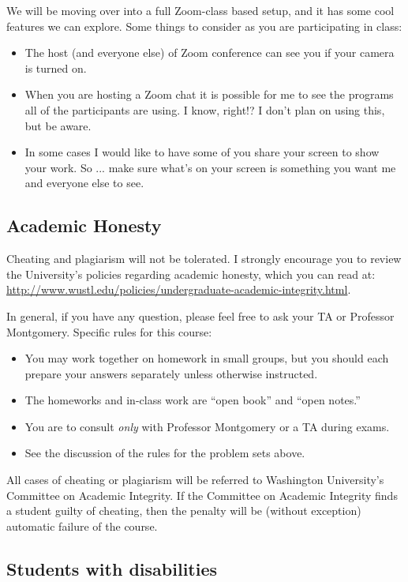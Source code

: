 \documentclass[11pt]{article}
\begin{document}
We will be moving over into a full Zoom-class based setup, and it has some cool features we can explore.  Some things to consider as you are participating in class:
\begin{itemize}
\item The host (and everyone else) of Zoom conference can see you if your camera is turned on. 
\item When you are hosting a Zoom chat it is possible for me to see the programs all of the participants are using.  I know, right!?  I don't plan on using this, but be aware.
\item In some cases I would like to have some of you share your screen to show your work.  So ... make sure what's on your screen is something you want me and everyone else to see.
\end{itemize}


\subsection*{Academic Honesty} 

Cheating and plagiarism will not be tolerated.  I strongly encourage
you to review the University's policies regarding academic honesty,
which you can read at:
\url{http://www.wustl.edu/policies/undergraduate-academic-integrity.html}.

In general, if you have any question, please feel free to ask
your TA or Professor Montgomery. Specific rules for this course:
\begin{itemize}
\item You may work together on homework in small groups, but you
  should each prepare your answers separately unless otherwise instructed.
\item The homeworks and in-class work are ``open book'' and ``open
  notes.''  
\item You are to consult \textit{only} with Professor Montgomery or
  a TA during exams.
\item See the discussion of the rules for the problem sets above.
\end{itemize}

\noindent All cases of cheating or plagiarism will be referred to Washington
University's Committee on Academic Integrity. If the Committee on
Academic Integrity finds a student guilty of cheating, then the
penalty will be (without exception) automatic failure of the course.

\subsection*{Students with disabilities}
\end{document}
